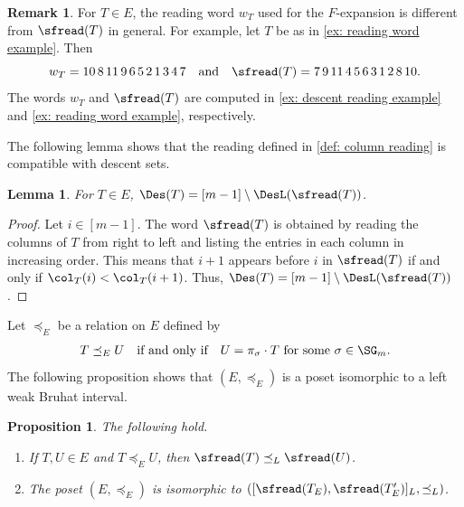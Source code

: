 \documentclass[12pt, reqno]{amsart}
\numberwithin{equation}{section}
\numberwithin{figure}{section}
\numberwithin{table}{section}
\newtheorem{proposition}[theorem]{Proposition}
\newtheorem{lemma}[theorem]{Lemma}
\theoremstyle{definition}
\newtheorem{remark}[theorem]{Remark}
\begin{document}
\begin{remark}
For $T \in E$, the reading word $w_T$ used for the $F$-expansion is different from $\sfread(T)$ in general.
For example, let $T$ be as in \cref{ex: reading word example}.
Then
\[
w_T=10\,8\,11\,9\,6\,5\,2\,1\,3\,4\,7 \quad \text{and} \quad
\sfread(T)=7\,9\,11\,4\,5\,6\,3\,1\,2\,8\,10.
\]
The words $w_T$ and $\sfread(T)$ are computed in \cref{ex: descent reading example} and \cref{ex: reading word example}, respectively.
\end{remark}


The following lemma shows that the reading defined in \cref{def: column reading} is compatible with descent sets.


\begin{lemma}\label{lem: column reading properties}
For $T \in E$, $\Des(T) = [m-1] \setminus \DesL(\sfread(T))$.
\end{lemma}

\begin{proof}
Let $i \in [m-1]$.
The word $\sfread(T)$ is obtained by reading the columns of $T$ from right to left and listing the entries in each column in increasing order.
This means that $i+1$ appears before $i$ in $\sfread(T)$ if and only if $\col_T(i)<\col_T(i+1)$.
Thus, $\Des(T) = [m-1] \setminus \DesL(\sfread(T))$.
\end{proof}

Let $\preceq_E$ be a relation on $E$ defined by 
\begin{align*}
T \preceq_E U
\quad \text{if and only if} \quad 
U = \pi_\sigma \cdot T \text{ for some } \sigma \in \SG_m.
\end{align*}
The following proposition shows that $(E,\preceq_E)$ is a poset isomorphic to a left weak Bruhat interval.




\begin{proposition}\label{prop: class is weak interval}
The following hold.
\begin{enumerate}[label = {\rm (\arabic*)}]
\item
If $T,U \in E$ and $T \preceq_E U$, then $\sfread(T) \preceq_L \sfread(U)$.

\item
The poset $(E,\preceq_E)$ is isomorphic to $([\sfread(T_E),\sfread(T'_E)]_L,\preceq_L)$.
\end{enumerate}
\end{proposition}
\end{document}

